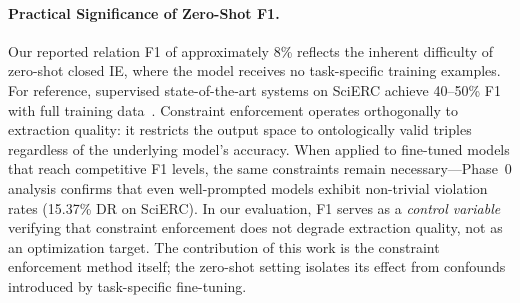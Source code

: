 

\paragraph{Practical Significance of Zero-Shot F1.}
Our reported relation F1 of approximately 8\% reflects the inherent difficulty of zero-shot closed IE, where the model receives no task-specific training examples.
For reference, supervised state-of-the-art systems on SciERC achieve 40--50\% F1 with full training data~\citep{zhong2021frustratingly,ye2022packed}.
Constraint enforcement operates orthogonally to extraction quality: it restricts the output space to ontologically valid triples regardless of the underlying model's accuracy.
When applied to fine-tuned models that reach competitive F1 levels, the same constraints remain necessary---Phase~0 analysis confirms that even well-prompted models exhibit non-trivial violation rates (15.37\% DR on SciERC).
In our evaluation, F1 serves as a \emph{control variable} verifying that constraint enforcement does not degrade extraction quality, not as an optimization target.
The contribution of this work is the constraint enforcement method itself; the zero-shot setting isolates its effect from confounds introduced by task-specific fine-tuning.


